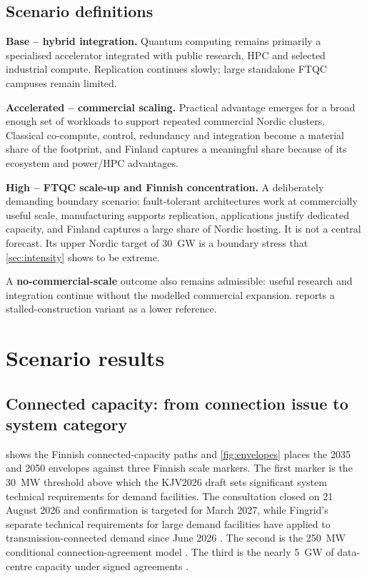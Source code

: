 \documentclass[11pt,a4paper]{article}
\begin{document}
\subsection{Scenario definitions}
\textbf{Base -- hybrid integration.} Quantum computing remains primarily a specialised accelerator integrated with public research, HPC and selected industrial compute. Replication continues slowly; large standalone FTQC campuses remain limited.

\textbf{Accelerated -- commercial scaling.} Practical advantage emerges for a broad enough set of workloads to support repeated commercial Nordic clusters. Classical co-compute, control, redundancy and integration become a material share of the footprint, and Finland captures a meaningful share because of its ecosystem and power/HPC advantages.

\textbf{High -- FTQC scale-up and Finnish concentration.} A deliberately demanding boundary scenario: fault-tolerant architectures work at commercially useful scale, manufacturing supports replication, applications justify dedicated capacity, and Finland captures a large share of Nordic hosting. It is not a central forecast. Its upper Nordic target of 30~GW is a boundary stress that \cref{sec:intensity} shows to be extreme.

A \textbf{no-commercial-scale} outcome also remains admissible: useful research and integration continue without the modelled commercial expansion.  reports a stalled-construction variant as a lower reference.

\section{Scenario results}
\subsection{Connected capacity: from connection issue to system category}
 shows the Finnish connected-capacity paths and \cref{fig:envelopes} places the 2035 and 2050 envelopes against three Finnish scale markers. The first marker is the 30~MW threshold above which the KJV2026 draft sets significant system technical requirements for demand facilities. The consultation closed on 21 August 2026 and confirmation is targeted for March 2027, while Fingrid's separate technical requirements for large demand facilities have applied to transmission-connected demand since June 2026 \citep{fingrid2026kjv,fingrid2026large}. The second is the 250~MW conditional connection-agreement model \citep{fingrid2025conditional}. The third is the nearly 5~GW of data-centre capacity under signed agreements \citep{fingrid2026prospects}.
\end{document}
